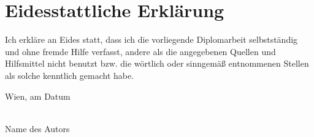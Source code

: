 \chapter*{Eidesstattliche Erkl\"arung}
\thispagestyle{empty}

\vspace*{2cm}

Ich erkl\"are an Eides statt, dass ich die vorliegende Diplomarbeit selbstst\"andig und ohne fremde Hilfe verfasst, andere als die angegebenen Quellen und Hilfsmittel nicht benutzt bzw. die w\"ortlich oder sinngem\"a{\ss} entnommenen Stellen als solche kenntlich gemacht habe.

\vspace*{3cm}

\noindent
Wien, am {\color{change}Datum} %
%
\hfill
%
\begin{minipage}[t]{5cm}
  \centering
  \underline{\hspace*{5cm}}\\
  \small\color{change}Name des Autors
\end{minipage}